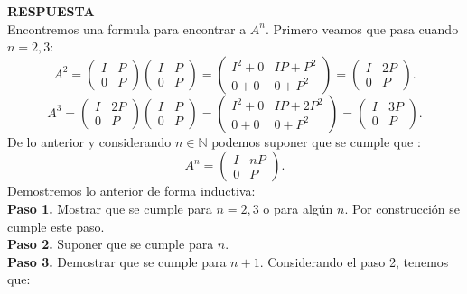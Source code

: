\documentclass[11pt,letterpaper]{article}
\newcommand{\res}{\textbf{RESPUESTA}\\}
\begin{document}
\begin{enumerate}
\res
Encontremos una formula para encontrar a $A^n$. Primero veamos que pasa cuando $n=2,3$:
\begin{equation*}
A^2=\left(\begin{array}{cc}
I& P\\
0&P
\end{array}
\right)\left(\begin{array}{cc}
I& P\\
0&P
\end{array}
\right)=
\left(\begin{array}{cc}
I^2+0& IP+P^2\\
0+0&0+P^2
\end{array}
\right)=\left(\begin{array}{cc}
I&2P\\
0&P
\end{array}
\right).
\end{equation*}
\begin{equation*}
A^3=\left(\begin{array}{cc}
I& 2P\\
0&P
\end{array}
\right)\left(\begin{array}{cc}
I& P\\
0&P
\end{array}
\right)=
\left(\begin{array}{cc}
I^2+0& IP+2P^2\\
0+0&0+P^2
\end{array}
\right)=\left(\begin{array}{cc}
I&3P\\
0&P
\end{array}
\right).
\end{equation*}
De lo anterior y considerando $n\in \mathbb{N}$ podemos suponer que se cumple que :
\begin{equation*}
A^n= \left(\begin{array}{cc}
I&nP\\
0&P
\end{array}
\right).
\end{equation*}
Demostremos lo anterior de forma inductiva: \\
\textbf{Paso 1.} Mostrar que se cumple para $n=2,3$ o para algún $n$. Por construcción se cumple este paso.\\
\textbf{Paso 2.} Suponer que se cumple para $n$.\\
\textbf{Paso 3.} Demostrar que se cumple para $n+1$. Considerando el paso 2, tenemos que:
\begin{equation*}

\end{equation*}
\end{enumerate}
\end{document}
